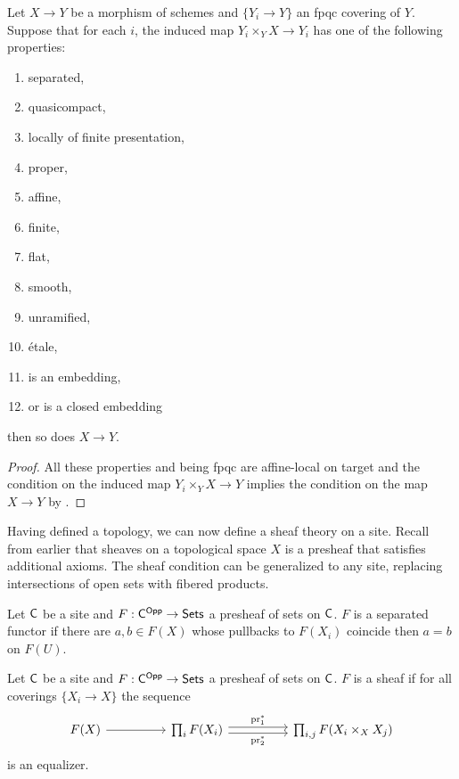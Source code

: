 \begin{proposition}
    Let $X\to Y$ be a morphism of schemes and $\{Y_{i}\to Y\}$ an fpqc covering of $Y$. Suppose that for each $i$, the induced map $Y_{i}\times_{Y}X\to Y_{i}$ has one of the following properties: 
    \begin{enumerate}[label=(\alph*)]
        \item separated, 
        \item quasicompact, 
        \item locally of finite presentation, 
        \item proper, 
        \item affine, 
        \item finite, 
        \item flat, 
        \item smooth, 
        \item unramified, 
        \item \'{e}tale,
        \item is an embedding, 
        \item or is a closed embedding
    \end{enumerate}
    then so does $X\to Y$. 
\end{proposition}
\begin{proof}
    All these properties and being fpqc are affine-local on target and the condition on the induced map $Y_{i}\times_{Y}X\to Y$ implies the condition on the map $X\to Y$ by \cite[Prop. 2.7.1]{EGAIVpt1}. 
\end{proof}
Having defined a topology, we can now define a sheaf theory on a site. Recall from earlier that sheaves on a topological space $X$ is a presheaf that satisfies additional axioms. The sheaf condition can be generalized to any site, replacing intersections of open sets with fibered products. 
\begin{definition}\label{def: sep presheaf on site}
    Let $\mathsf{C}$ be a site and $F:\mathsf{C}^{\mathsf{Opp}}\to\mathsf{Sets}$ a presheaf of sets on $\mathsf{C}$. $F$ is a separated functor if there are $a,b\in F(X)$ whose pullbacks to $F(X_{i})$ coincide then $a=b$ on $F(U)$. 
\end{definition}
\begin{definition}\label{def: sheaf on site}
    Let $\mathsf{C}$ be a site and $F:\mathsf{C}^{\mathsf{Opp}}\to\mathsf{Sets}$ a presheaf of sets on $\mathsf{C}$. $F$ is a sheaf if for all coverings $\{X_{i}\to X\}$ the sequence 
    $$%
    \begin{tikzcd}
        {F(X)} && {\prod_{i}F(X_{i})} && {\prod_{i,j}F(X_{i}\times_{X}X_{j})}
        \arrow[from=1-1, to=1-3]
        \arrow["{\pr_{1}^{*}}", shift left, from=1-3, to=1-5]
        \arrow["{\pr_{2}^{*}}"', shift right, from=1-3, to=1-5]
    \end{tikzcd}$$
    is an equalizer. 
\end{definition}
